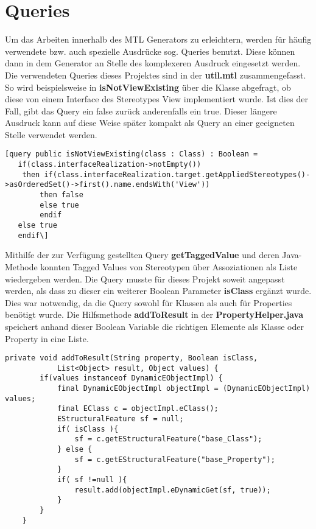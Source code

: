 \section{Queries} \label{Queries}
Um das Arbeiten innerhalb des MTL Generators zu erleichtern, werden für häufig verwendete bzw. auch spezielle Ausdrücke sog. Queries benutzt. Diese können dann in dem Generator an Stelle des komplexeren Ausdruck eingesetzt werden. Die verwendeten Queries dieses Projektes sind in der \textbf{util.mtl} zusammengefasst. So wird beispielsweise in \textbf{isNotViewExisting} über die Klasse abgefragt, ob diese von einem Interface des Stereotypes View implementiert wurde. Ist dies der Fall, gibt das Query ein false zurück anderenfalls ein true. Dieser längere Ausdruck kann auf diese Weise später kompakt als Query an einer geeigneten Stelle verwendet werden.\\

\lstset{language=OCL}
\begin{lstlisting}[caption={Query für isNotViewExisting}]
[query public isNotViewExisting(class : Class) : Boolean = 
   if(class.interfaceRealization->notEmpty())
	then if(class.interfaceRealization.target.getAppliedStereotypes()->asOrderedSet()->first().name.endsWith('View')) 
		then false 
		else true 
        endif 
   else true 
   endif\]
\end{lstlisting}

Mithilfe der zur Verfügung gestellten Query \textbf{getTaggedValue} und deren Java-Methode konnten Tagged Values von Stereotypen über Assoziationen als Liste wiedergeben werden. Die Query musste für dieses Projekt soweit angepasst werden, als dass zu dieser ein weiterer Boolean Parameter \textbf{isClass} ergänzt wurde. Dies war notwendig, da die Query sowohl für Klassen als auch für Properties benötigt wurde.
Die Hilfsmethode \textbf{addToResult} in der \textbf{PropertyHelper.java} speichert anhand dieser Boolean Variable die richtigen Elemente als Klasse oder Property in eine Liste.
\lstset{language=Java}
\begin{lstlisting}[caption={Hilfsmethode addToResult der PropertyHelper.java}]
private void addToResult(String property, Boolean isClass,
			List<Object> result, Object values) {
		if(values instanceof DynamicEObjectImpl) {
			final DynamicEObjectImpl objectImpl = (DynamicEObjectImpl) values;
			final EClass c = objectImpl.eClass();
			EStructuralFeature sf = null;
			if( isClass ){
				sf = c.getEStructuralFeature("base_Class");
			} else {
				sf = c.getEStructuralFeature("base_Property");
			}
			if( sf !=null ){
				result.add(objectImpl.eDynamicGet(sf, true));
			}
		}
	}
\end{lstlisting}